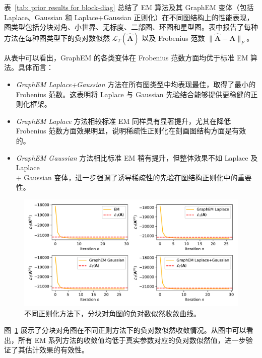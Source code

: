 表~\ref{tab: prior results for block-diag} 总结了 EM 算法及其 GraphEM 变体（包括 Laplace、Gaussian 和 Laplace+Gaussian 正则化）在不同图结构上的性能表现，图类型包括分块对角、小世界、无标度、二部图、环图和星型图。表中报告了每种方法在每种图类型下的负对数似然 \(\mathcal{L}_T(\widehat{\mathbf{A}})\) 以及 Frobenius 范数 \(\| \widehat{\mathbf{A}} - \mathbf{A} \|_F\)。

从表中可以看出，GraphEM 的各类变体在 Frobenius 范数方面均优于标准 EM 算法。具体而言：
\begin{itemize}
    \item \textit{GraphEM Laplace+Gaussian} 方法在所有图类型中均表现最佳，取得了最小的 Frobenius 范数。这表明将 Laplace 与 Gaussian 先验结合能够提供更稳健的正则化框架。
    \item \textit{GraphEM Laplace} 方法相较标准 EM 同样具有显著提升，尤其在降低 Frobenius 范数方面效果明显，说明稀疏性正则化在刻画图结构方面是有效的。
    \item \textit{GraphEM Gaussian} 方法相比标准 EM 稍有提升，但整体效果不如 Laplace 及 Laplace \\ 
    + Gaussian 变体，进一步强调了诱导稀疏性的先验在图结构正则化中的重要性。
\end{itemize}

\begin{figure}[tb]
    \centering
    \includegraphics[width=0.85\linewidth]{fig/block diagonal/neg_log_likelihood.pdf}
    \caption{不同正则化方法下，分块对角图的负对数似然收敛曲线。}
    \label{fig: neg log likelihood}
\end{figure}

图~\ref{fig: neg log likelihood} 展示了分块对角图在不同正则方法下的负对数似然收敛情况。从图中可以看出，所有 EM 系列方法的收敛值均低于真实参数对应的负对数似然值，进一步验证了其估计效果的有效性。

